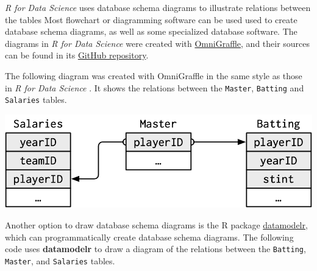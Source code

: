 \documentclass[]{book}
\theoremstyle{plain}
\theoremstyle{remark}
\begin{document}
\emph{R for Data Science} uses database schema diagrams to illustrate relations between the tables
Most flowchart or diagramming software can be used used to create database schema diagrams, as well as some specialized database software.
The diagrams in \emph{R for Data Science} were created with \href{https://www.gliffy.com/}{OmniGraffle}, and their sources can be found in its \href{https://github.com/hadley/r4ds/tree/master/diagrams}{GitHub repository}.

The following diagram was created with OmniGraffle in the same style as those
in \emph{R for Data Science} .
It shows the relations between the \texttt{Master}, \texttt{Batting} and \texttt{Salaries} tables.

\begin{center}\includegraphics[width=12.68in]{diagrams/Lahman1} \end{center}

Another option to draw database schema diagrams is the R package \href{https://github.com/bergant/datamodelr}{datamodelr}, which can programmatically create database schema diagrams.
The following code uses \textbf{datamodelr} to draw a diagram of the relations between the \texttt{Batting}, \texttt{Master}, and \texttt{Salaries} tables.
\end{document}
